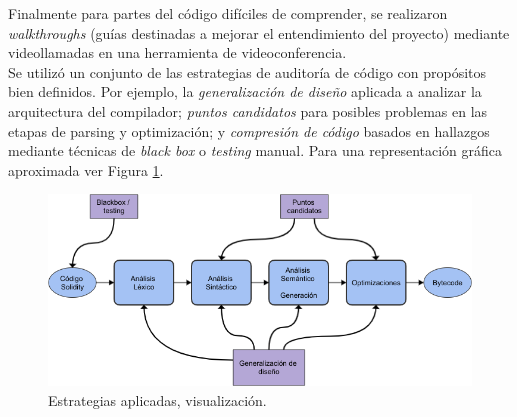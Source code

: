 Finalmente para partes del código difíciles de comprender, se realizaron \textit{walkthroughs} (guías destinadas a mejorar el entendimiento del proyecto) mediante videollamadas en una herramienta de videoconferencia\cite{MeetLink}.\\ 

Se utilizó un conjunto de las estrategias de auditoría de código con propósitos bien definidos. Por ejemplo, la \textit{generalización de diseño} aplicada a analizar la arquitectura del compilador; \textit{puntos candidatos} para posibles problemas en las etapas de parsing y optimización; y \textit{compresión de código} basados en hallazgos mediante técnicas de \textit{black box} o \textit{testing} manual. Para una representación gráfica aproximada ver Figura \ref{fig:metodologia}.\\

\begin{figure}[ht]
    \centering
    \includegraphics[scale=0.5]{images/methodology.png}
    \caption{Estrategias aplicadas, visualización.}
    \label{fig:metodologia}
\end{figure}

